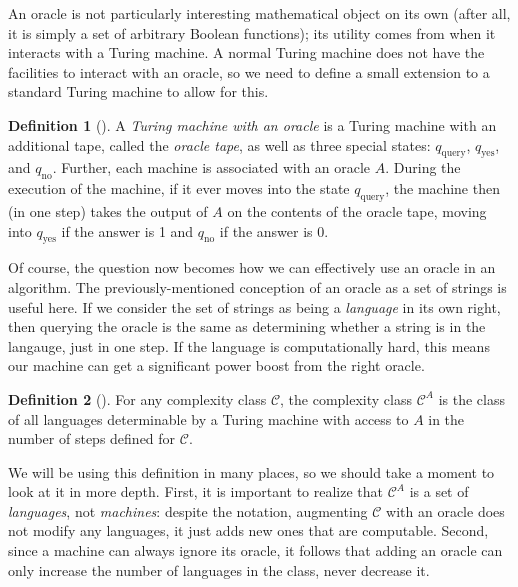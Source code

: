 \documentclass[english]{reedthesis}
\theoremstyle{plain}
\theoremstyle{definition}
\newtheorem{defn}[defn]{Definition}
\theoremstyle{remark}
\begin{document}

An oracle is not particularly interesting mathematical object on its own (after
all, it is simply a set of arbitrary Boolean functions); its utility comes from
when it interacts with a Turing machine. A normal Turing machine does not have
the facilities to interact with an oracle, so we need to define a small
extension to a standard Turing machine to allow for this.

\begin{defn}[{\cite[Def.\ 3.6]{AB09}}]\label{def:tm-oracle}
  A \emph{Turing machine with an oracle} is a Turing machine with an additional
  tape, called the \emph{oracle tape}, as well as three special states:
  $q_{\text{query}}$, $q_{\text{yes}}$, and $q_{\text{no}}$. Further, each
  machine is associated with an oracle $A$. During the execution of the machine,
  if it ever moves into the state $q_{\text{query}}$, the machine then (in one
  step) takes the output of $A$ on the contents of the oracle tape, moving into
  $q_{\text{yes}}$ if the answer is 1 and $q_{\text{no}}$ if the answer is 0.
\end{defn}

Of course, the question now becomes how we can effectively use an oracle in an
algorithm. The previously-mentioned conception of an oracle as a set of strings
is useful here. If we consider the set of strings as being a \emph{language} in
its own right, then querying the oracle is the same as determining whether a
string is in the langauge, just in one step. If the language is computationally
hard, this means our machine can get a significant power boost from the right
oracle.

\begin{defn}[{\cite[Def.\ 2.1]{AW09}}]\label{def:oracle-class}
  For any complexity class $\mathcal{C}$, the complexity class $\mathcal{C}^{A}$ is the class of all
  languages determinable by a Turing machine with access to $A$ in the number of
  steps defined for $\mathcal{C}$.
\end{defn}

We will be using this definition in many places, so we should take a moment to
look at it in more depth. First, it is important to realize that $\mathcal{C}^{A}$ is a
set of \emph{languages}, not \emph{machines}: despite the notation, augmenting
$\mathcal{C}$ with an oracle does not modify any languages, it just adds new ones that are
computable. Second, since a machine can always ignore its oracle, it follows
that adding an oracle can only increase the number of languages in the class,
never decrease it.
\end{document}
